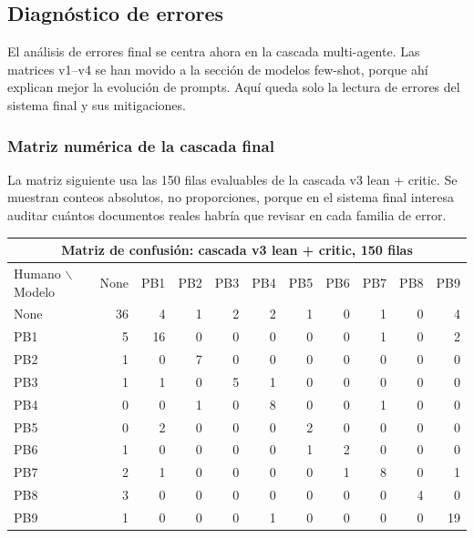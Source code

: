 
\subsection{Diagnóstico de errores}

El análisis de errores final se centra ahora en la cascada multi-agente. Las matrices v1--v4 se han movido a la sección de modelos few-shot, porque ahí explican mejor la evolución de prompts. Aquí queda solo la lectura de errores del sistema final y sus mitigaciones.

\subsubsection{Matriz numérica de la cascada final}

La matriz siguiente usa las 150 filas evaluables de la cascada v3 lean + critic. Se muestran conteos absolutos, no proporciones, porque en el sistema final interesa auditar cuántos documentos reales habría que revisar en cada familia de error.

\begin{center}
\tiny
\setlength{\tabcolsep}{2.6pt}
\renewcommand{\arraystretch}{1.08}
\begin{tabular}{lrrrrrrrrrr}
\toprule
\multicolumn{11}{c}{\textbf{Matriz de confusión: cascada v3 lean + critic, 150 filas}} \\
\midrule
Humano $\backslash$ Modelo & None & PB1 & PB2 & PB3 & PB4 & PB5 & PB6 & PB7 & PB8 & PB9 \\
\midrule
None & 36 & 4 & 1 & 2 & 2 & 1 & 0 & 1 & 0 & 4 \\
PB1  & 5  & 16 & 0 & 0 & 0 & 0 & 0 & 1 & 0 & 2 \\
PB2  & 1  & 0 & 7 & 0 & 0 & 0 & 0 & 0 & 0 & 0 \\
PB3  & 1  & 1 & 0 & 5 & 1 & 0 & 0 & 0 & 0 & 0 \\
PB4  & 0  & 0 & 1 & 0 & 8 & 0 & 0 & 1 & 0 & 0 \\
PB5  & 0  & 2 & 0 & 0 & 0 & 2 & 0 & 0 & 0 & 0 \\
PB6  & 1  & 0 & 0 & 0 & 0 & 1 & 2 & 0 & 0 & 0 \\
PB7  & 2  & 1 & 0 & 0 & 0 & 0 & 1 & 8 & 0 & 1 \\
PB8  & 3  & 0 & 0 & 0 & 0 & 0 & 0 & 0 & 4 & 0 \\
PB9  & 1  & 0 & 0 & 0 & 1 & 0 & 0 & 0 & 0 & 19 \\
\bottomrule
\end{tabular}
\end{center}

